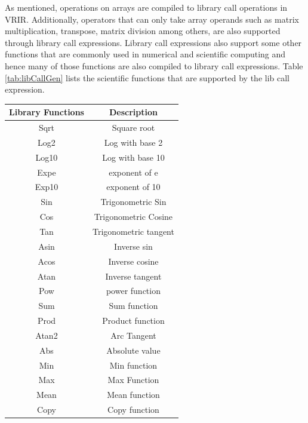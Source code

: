 As mentioned, operations on arrays are compiled to library call operations in VRIR. Additionally, operators that can only take array operands such as matrix multiplication, transpose, matrix division among others, are also supported through library call expressions. Library call expressions also support some other functions that are commonly used in numerical and scientific computing and hence many of those functions are also compiled to library call expressions. Table \ref{tab:libCallGen} lists the scientific functions that are supported by the lib call expression. 
\begin{table}[htbp]
\centering
\begin{tabular}{|c|c|}
\hline
Library Functions & Description           \\ \hline
Sqrt              & Square root           \\ \hline
Log2              & Log with base 2       \\ \hline
Log10             & Log with base 10      \\ \hline
Expe              & exponent of e         \\ \hline
Exp10             & exponent of 10        \\ \hline
Sin               & Trigonometric Sin     \\ \hline
Cos               & Trigonometric Cosine  \\ \hline
Tan               & Trigonometric tangent \\ \hline
Asin              & Inverse sin           \\ \hline
Acos              & Inverse cosine        \\ \hline
Atan              & Inverse tangent       \\ \hline
Pow               & power function        \\ \hline
Sum               & Sum function          \\ \hline
Prod              & Product function      \\ \hline
Atan2             & Arc Tangent           \\ \hline
Abs               & Absolute value        \\ \hline
Min               & Min function          \\ \hline
Max               & Max Function          \\ \hline
Mean              & Mean function         \\ \hline
Copy              & Copy function         \\ \hline

\end{tabular}
\end{table}
